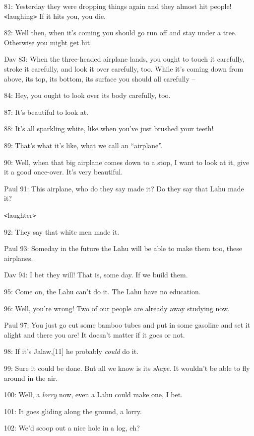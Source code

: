 {81: Yesterday they were dropping things again and they almost hit people!
\texttt{<}laughing\texttt{>} If it hits you, you die.}

{82: Well then, when it's coming you should go run off and stay under a
tree. Otherwise you might get hit. }

{Dav 83: When the three-headed airplane lands, you ought to touch it carefully,
stroke it carefully, and look it over carefully, too. While it's coming down from
above, its top, its bottom, its surface you should all carefully --}

{84: Hey, you ought to look over its body carefully, too.}

{87: It's beautiful to look at.}

{88: It's all sparkling white, like when you've just brushed your teeth!}

{89: That's what it's like, what we call an ``airplane''.}

{90: Well, when that big airplane comes down to a stop, I want to look at
it, give it a good once-over. It's very beautiful.}

{Paul 91: This airplane, who do they say made it? Do they say that Lahu
made it? }

{\texttt{<}laughter\texttt{>}}

{92: They say that white men made it.}

{Paul 93: Someday in the future the Lahu will be able to make them too,
these airplanes. }

{Dav 94: I bet they will! That is, some day. If we build them. }

{95: Come on, the Lahu can't do it. The Lahu have no education. }

{96: Well, you're wrong! Two of our people are already away studying now.
}

{Paul 97: You just go cut some bamboo tubes and put in some gasoline and
set it alight and there you are! It doesn't matter if it goes or not. }

{98: If it's Jalaw,[11] he probably }{\textit{could}}{ do
it. }

{99: Sure it could be done. But all we know is its }{\textit{shape}}{.
It wouldn't be able to fly around in the air. }

{100: Well, a }{\textit{lorry }}{now, even a Lahu could make
one, I bet. }

{101: It goes gliding along the ground, a lorry.}

{102: We'd scoop out a nice hole in a log, eh? }

